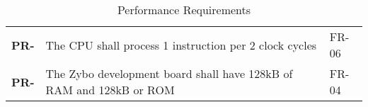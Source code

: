 \resetfyshcounter
\newcommand{\pr}[2]{
	\textbf{PR-\rc} & #1 & #2 \\
	\hline
}
\begin{table}[H]
	\begin{tabularx}{\textwidth}{| a | x | a |}
		\hline
		 &  &  \\
		\hline
		\pr{The CPU shall process 1 instruction per 2 clock cycles}{FR-06}
		\pr{The Zybo development board shall have 128kB of RAM and 128kB or ROM}{FR-04}
	\end{tabularx}
	\caption{Performance Requirements}
\end{table}

